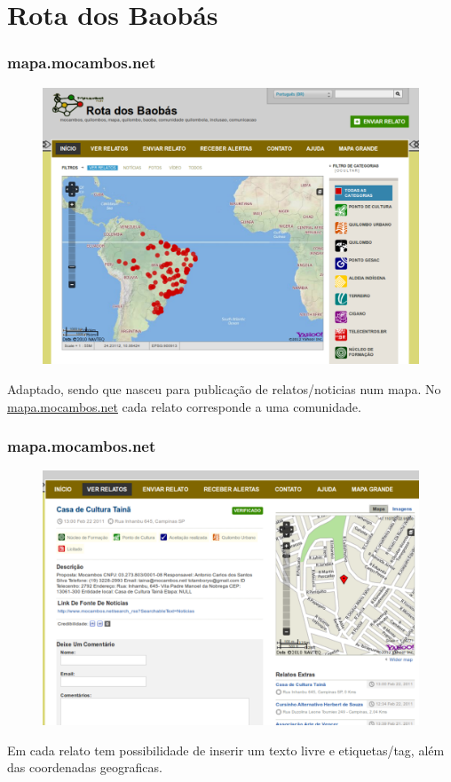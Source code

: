 \documentclass{beamer}
\begin{document}
{\section{Rota dos Baob\'{a}s}

\begin{frame}
  \frametitle{mapa.mocambos.net}
	\begin{figure}
          \vfill
          \includegraphics[height=0.5\textheight]{./FIG/mapa_geral1.pdf}
 	\end{figure}
  Adaptado, sendo que nasceu para publicação de relatos/noticias num mapa.
  No \url{mapa.mocambos.net} cada relato corresponde a uma comunidade.
\end{frame}

\begin{frame}
  \frametitle{mapa.mocambos.net}
	\begin{figure}
          \vfill
          \includegraphics[height=0.5\textheight]{./FIG/mapa_relato2.pdf}
 	\end{figure}
        Em cada relato tem possibilidade de inserir um texto livre e
        etiquetas/tag, além das coordenadas geograficas.
\end{frame}

}
\end{document}
